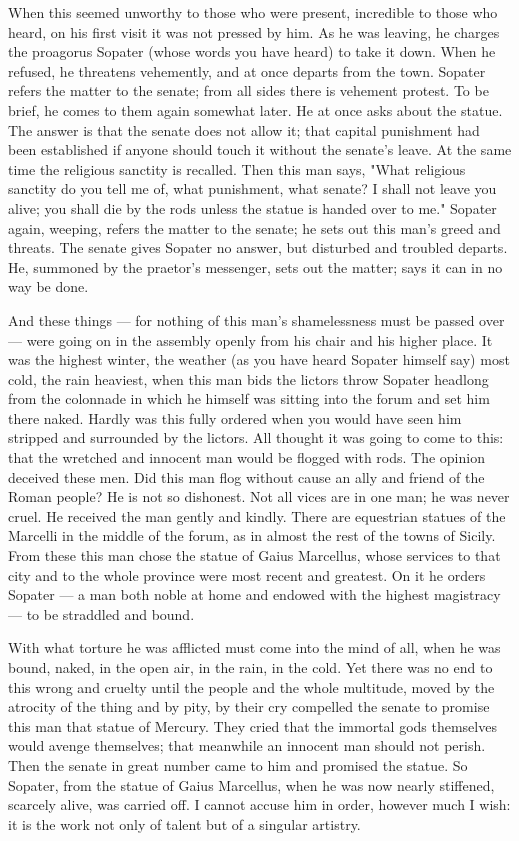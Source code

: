  When this seemed unworthy to those who were present, incredible to those who heard, on his first visit it was not pressed by him. As he was leaving, he charges the proagorus Sopater (whose words you have heard) to take it down. When he refused, he threatens vehemently, and at once departs from the town. Sopater refers the matter to the senate; from all sides there is vehement protest. To be brief, he comes to them again somewhat later. He at once asks about the statue. The answer is that the senate does not allow it; that capital punishment had been established if anyone should touch it without the senate's leave. At the same time the religious sanctity is recalled. Then this man says, "What religious sanctity do you tell me of, what punishment, what senate? I shall not leave you alive; you shall die by the rods unless the statue is handed over to me." Sopater again, weeping, refers the matter to the senate; he sets out this man's greed and threats. The senate gives Sopater no answer, but disturbed and troubled departs. He, summoned by the praetor's messenger, sets out the matter; says it can in no way be done.

 And these things --- for nothing of this man's shamelessness must be passed over --- were going on in the assembly openly from his chair and his higher place. It was the highest winter, the weather (as you have heard Sopater himself say) most cold, the rain heaviest, when this man bids the lictors throw Sopater headlong from the colonnade in which he himself was sitting into the forum and set him there naked. Hardly was this fully ordered when you would have seen him stripped and surrounded by the lictors. All thought it was going to come to this: that the wretched and innocent man would be flogged with rods. The opinion deceived these men. Did this man flog without cause an ally and friend of the Roman people? He is not so dishonest. Not all vices are in one man; he was never cruel. He received the man gently and kindly. There are equestrian statues of the Marcelli in the middle of the forum, as in almost the rest of the towns of Sicily. From these this man chose the statue of Gaius Marcellus, whose services to that city and to the whole province were most recent and greatest. On it he orders Sopater --- a man both noble at home and endowed with the highest magistracy --- to be straddled and bound.

 With what torture he was afflicted must come into the mind of all, when he was bound, naked, in the open air, in the rain, in the cold. Yet there was no end to this wrong and cruelty until the people and the whole multitude, moved by the atrocity of the thing and by pity, by their cry compelled the senate to promise this man that statue of Mercury. They cried that the immortal gods themselves would avenge themselves; that meanwhile an innocent man should not perish. Then the senate in great number came to him and promised the statue. So Sopater, from the statue of Gaius Marcellus, when he was now nearly stiffened, scarcely alive, was carried off. I cannot accuse him in order, however much I wish: it is the work not only of talent but of a singular artistry.

